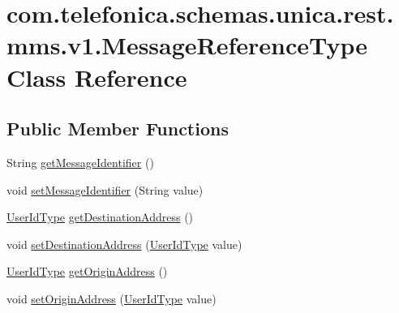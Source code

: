 \hypertarget{classcom_1_1telefonica_1_1schemas_1_1unica_1_1rest_1_1mms_1_1v1_1_1MessageReferenceType}{
\section{com.telefonica.schemas.unica.rest.mms.v1.MessageReferenceType Class Reference}
\label{classcom_1_1telefonica_1_1schemas_1_1unica_1_1rest_1_1mms_1_1v1_1_1MessageReferenceType}
}
\subsection*{Public Member Functions}
\begin{DoxyCompactItemize}
\item 
String \hyperlink{classcom_1_1telefonica_1_1schemas_1_1unica_1_1rest_1_1mms_1_1v1_1_1MessageReferenceType_a15ac927c0b6e5469eb4cc79699f35516}{getMessageIdentifier} ()
\item 
void \hyperlink{classcom_1_1telefonica_1_1schemas_1_1unica_1_1rest_1_1mms_1_1v1_1_1MessageReferenceType_a233df5070bf079503b9a91c4904d3d93}{setMessageIdentifier} (String value)
\item 
\hyperlink{classcom_1_1telefonica_1_1schemas_1_1unica_1_1rest_1_1common_1_1v1_1_1UserIdType}{UserIdType} \hyperlink{classcom_1_1telefonica_1_1schemas_1_1unica_1_1rest_1_1mms_1_1v1_1_1MessageReferenceType_a0075ab491da1e7cda4763e6198c1856f}{getDestinationAddress} ()
\item 
void \hyperlink{classcom_1_1telefonica_1_1schemas_1_1unica_1_1rest_1_1mms_1_1v1_1_1MessageReferenceType_a15b98a0858857e94ad9af69211e6d75d}{setDestinationAddress} (\hyperlink{classcom_1_1telefonica_1_1schemas_1_1unica_1_1rest_1_1common_1_1v1_1_1UserIdType}{UserIdType} value)
\item 
\hyperlink{classcom_1_1telefonica_1_1schemas_1_1unica_1_1rest_1_1common_1_1v1_1_1UserIdType}{UserIdType} \hyperlink{classcom_1_1telefonica_1_1schemas_1_1unica_1_1rest_1_1mms_1_1v1_1_1MessageReferenceType_a80bc0c6833314ca1daa274dcf14fdef6}{getOriginAddress} ()
\item 
void \hyperlink{classcom_1_1telefonica_1_1schemas_1_1unica_1_1rest_1_1mms_1_1v1_1_1MessageReferenceType_aa09c4be43f094890aa2a5e297a315516}{setOriginAddress} (\hyperlink{classcom_1_1telefonica_1_1schemas_1_1unica_1_1rest_1_1common_1_1v1_1_1UserIdType}{UserIdType} value)
\item 

\end{DoxyCompactItemize}
